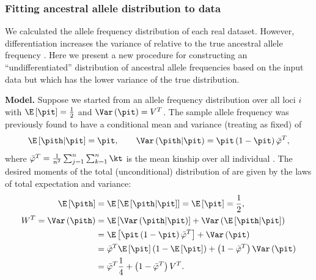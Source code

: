 \documentclass[11pt]{article}
\begin{document}
\subsubsection{Fitting ancestral allele distribution to data}

We calculated the allele frequency distribution \pith of each real dataset.
However, differentiation increases the variance of \pith relative to the true ancestral allele frequency \pit \citep{ochoa_estimating_2021}.
Here we present a new procedure for constructing an ``undifferentiated'' distribution of ancestral allele frequencies based on the input data \pith but which has the lower variance of the true \pit distribution.

\textbf{Model.}
Suppose we started from an allele frequency distribution \pit over all loci $i$ with $\E \left[ \pit \right] = \frac{1}{2}$ and $\Var \left( \pit \right) = V^T$.
The sample allele frequency \pith was previously found to have a conditional mean and variance (treating \pit as fixed) of
$$
\E \left[ \pith \middle| \pit \right]
=
\pit
, \quad\quad
\Var \left( \pith \middle| \pit \right)
=
\pit \left( 1 - \pit \right) \bar{\varphi}^T
,
$$
where $\bar{\varphi}^T = \frac{1}{n^2} \sum_{j=1}^n \sum_{k=1}^n \kt$ is the mean kinship over all individual \citep{ochoa_estimating_2021}.
The desired moments of the total (unconditional) distribution of \pith are given by the laws of total expectation and variance:
\begin{align*}
  \E \left[ \pith \right]
  &=
    \E \left[ \E \left[ \pith \middle| \pit \right] \right]
    =
    \E \left[ \pit \right]
    =
    \frac{1}{2}
    , \\
  W^T
  =
  \Var \left( \pith \right)
  &=
    \E \left[ \Var \left( \pith \middle| \pit \right) \right ]
    + \Var \left( \E \left[ \pith \middle| \pit \right] \right)
  \\
  &=
    \E \left[ \pit \left( 1 - \pit \right) \bar{\varphi}^T \right]
    + \Var \left( \pit \right)
  \\
  &=
    \bar{\varphi}^T \E \left[ \pit \right] \left( 1 - \E \left[ \pit \right] \right)
    + \left( 1 - \bar{\varphi}^T \right) \Var \left( \pit \right)
  \\
  &=
    \bar{\varphi}^T \frac{1}{4}
    + \left( 1 - \bar{\varphi}^T \right) V^T
    .
\end{align*}
\end{document}
